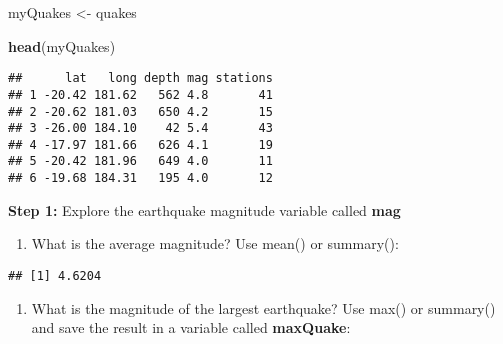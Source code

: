 \documentclass[
]{article}
\newenvironment{Shaded}{\begin{snugshade}}{\end{snugshade}}
\newcommand{\FunctionTok}[1]{\textcolor[rgb]{0.13,0.29,0.53}{\textbf{#1}}}
\newcommand{\NormalTok}[1]{#1}
\newcommand{\OtherTok}[1]{\textcolor[rgb]{0.56,0.35,0.01}{#1}}
\newcommand{\SpecialCharTok}[1]{\textcolor[rgb]{0.81,0.36,0.00}{\textbf{#1}}}
\providecommand{\tightlist}{%
  \setlength{\itemsep}{0pt}\setlength{\parskip}{0pt}}
\begin{document}
\begin{Shaded}
\begin{Highlighting}[]
\NormalTok{myQuakes }\OtherTok{\textless{}{-}}\NormalTok{ quakes}

\FunctionTok{head}\NormalTok{(myQuakes)}
\end{Highlighting}
\end{Shaded}

\begin{verbatim}
##      lat   long depth mag stations
## 1 -20.42 181.62   562 4.8       41
## 2 -20.62 181.03   650 4.2       15
## 3 -26.00 184.10    42 5.4       43
## 4 -17.97 181.66   626 4.1       19
## 5 -20.42 181.96   649 4.0       11
## 6 -19.68 184.31   195 4.0       12
\end{verbatim}

\textbf{Step 1:} Explore the earthquake magnitude variable called
\textbf{mag}

\begin{enumerate}
\def\labelenumi{\Alph{enumi}.}
\tightlist
\item
  What is the average magnitude? Use mean() or summary():
\end{enumerate}

\begin{Shaded}
\end{Shaded}

\begin{verbatim}
## [1] 4.6204
\end{verbatim}

\begin{enumerate}
\def\labelenumi{\Alph{enumi}.}
\setcounter{enumi}{1}
\tightlist
\item
  What is the magnitude of the largest earthquake? Use max() or
  summary() and save the result in a variable called \textbf{maxQuake}:
\end{enumerate}

\begin{Shaded}
\end{Shaded}
\end{document}
